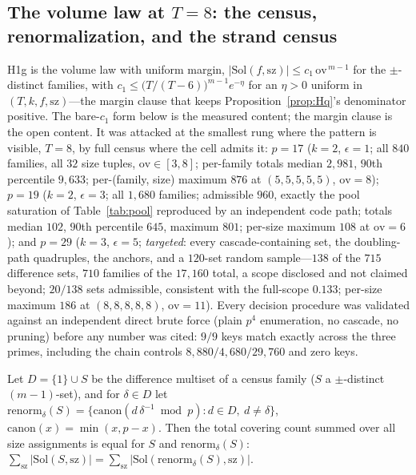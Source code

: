 \subsection{The volume law at \texorpdfstring{$T=8$}{T=8}: the census, renormalization, and the strand census}\label{sec:scale-h1}

H1g is the volume law with uniform margin,
$|\mathrm{Sol}(f,\mathrm{sz})|\le c_1\,\mathrm{ov}^{\,m-1}$ for the
$\pm$-distinct families, with $c_1\le\bigl(T/(T-6)\bigr)^{m-1}e^{-\eta}$
for an $\eta>0$ uniform in $(T,k,f,\mathrm{sz})$---the margin clause
that keeps Proposition~\ref{prop:Hq}'s denominator positive. The
bare-$c_1$ form below is the measured content; the margin clause is
the open content. It was attacked at the smallest rung where the
pattern is visible, $T=8$, by full census where the cell admits it:
$p=17$ ($k=2$, $\epsilon=1$; all $840$ families, all $32$ size tuples,
$\mathrm{ov}\in[3,8]$; per-family totals median $2{,}981$, $90$th
percentile $9{,}633$; per-(family, size) maximum $876$ at
$(5,5,5,5,5)$, $\mathrm{ov}=8$); $p=19$ ($k=2$, $\epsilon=3$; all
$1{,}680$ families; admissible $960$, exactly the pool saturation of
Table~\ref{tab:pool} reproduced by an independent code path; totals
median $102$, $90$th percentile $645$, maximum $801$; per-size maximum
$108$ at $\mathrm{ov}=6$); and $p=29$ ($k=3$, $\epsilon=5$;
\emph{targeted}: every cascade-containing set, the doubling-path
quadruples, the anchors, and a $120$-set random sample---$138$ of the
$715$ difference sets, $710$ families of the $17{,}160$ total, a scope
disclosed and not claimed beyond; $20/138$ sets admissible, consistent
with the full-scope $0.133$; per-size maximum $186$ at
$(8,8,8,8,8)$, $\mathrm{ov}=11$). Every decision procedure was
validated against an independent direct brute force (plain $p^4$
enumeration, no cascade, no pruning) before any number was cited:
$9/9$ keys match exactly across the three primes, including the chain
controls $8{,}880/4{,}680/29{,}760$ and zero keys.

\begin{lemma}\label{lem:renorm}
Let $D=\{1\}\cup S$ be the difference multiset of a census family ($S$
a $\pm$-distinct $(m-1)$-set), and for $\delta\in D$ let
$\mathrm{renorm}_\delta(S)=\{\mathrm{canon}(d\,\delta^{-1}\bmod p):
d\in D,\ d\ne\delta\}$, $\mathrm{canon}(x)=\min(x,p-x)$. Then the total
covering count summed over all size assignments is equal for $S$ and
$\mathrm{renorm}_\delta(S)$:
$\sum_{\mathrm{sz}}|\mathrm{Sol}(S,\mathrm{sz})|
=\sum_{\mathrm{sz}}|\mathrm{Sol}(\mathrm{renorm}_\delta(S),
\mathrm{sz})|$.
\end{lemma}

